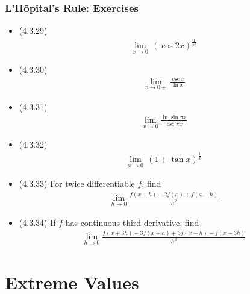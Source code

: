 \documentclass[usenames,dvipsnames,8pt,aspectratio=169]{beamer}
\begin{document}
\begin{frame}
  \frametitle{L'H\^opital's Rule: Exercises}
  \begin{itemize}
    \item (4.3.29)
      \begin{align*}
        \lim_{x\to 0}\,(\cos 2x)^{\frac{1}{x^2}}
      \end{align*}
    \item (4.3.30)
      \begin{align*}
        \lim_{x\to 0+}\frac{\csc x}{\ln x}
      \end{align*}
    \item (4.3.31)
      \begin{align*}
        \lim_{x\to 0}\frac{\ln\sin\pi x}{\csc\pi x}
      \end{align*}
    \item (4.3.32)
      \begin{align*}
        \lim_{x\to 0}\,(1 + \tan x)^{\frac{1}{x}}
      \end{align*}
    \item (4.3.33) For twice differentiable $f$, find 
      \begin{align*}
        \lim_{h\to 0}\frac{f(x + h) - 2 f(x) + f(x - h)}{h^2}
      \end{align*}
    \item (4.3.34) If $f$ has continuous third derivative, find
      \begin{align*}
        \lim_{h\to 0}\frac{f(x + 3h) - 3 f(x + h) + 3f(x - h) - f(x - 3h)}{h^3}
      \end{align*}
  \end{itemize}
\end{frame}


\section{Extreme Values}
\end{document}
